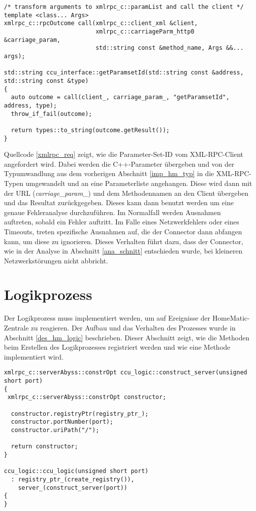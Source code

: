 \lstset{language=C++}
\begin{lstlisting}[frame=single,caption={Absetzen eines XML-RPC-Requests},label=xmlrpc_req]
/* transform arguments to xmlrpc_c::paramList and call the client */
template <class... Args>
xmlrpc_c::rpcOutcome call(xmlrpc_c::client_xml &client,
                          xmlrpc_c::carriageParm_http0 &carriage_param,
                          std::string const &method_name, Args &&... args);

std::string ccu_interface::getParamsetId(std::string const &address, std::string const &type)
{
  auto outcome = call(client_, carriage_param_, "getParamsetId", address, type);
  throw_if_fail(outcome);

  return types::to_string(outcome.getResult());
}
\end{lstlisting}

Quellcode \ref{xmlrpc_req} zeigt, wie die Parameter-Set-ID vom XML-RPC-Client angefordert wird.
Dabei werden die C++-Parameter übergeben und von der Typumwandlung aus dem vorherigen Abschnitt \ref{imp_hm_typ}
in die XML-RPC-Typen umgewandelt und an eine Parameterliste angehangen.
Diese wird dann mit der URL (\emph{carriage\_param\_}) und dem Methodennamen an den Client übergeben und
das Resultat zurückgegeben.
Dieses kann dann benutzt werden um eine genaue Fehleranalyse durchzuführen.
Im Normalfall werden Ausnahmen auftreten, sobald ein Fehler auftritt.
Im Falle eines Netzwerkfehlers oder eines Timeouts, treten spezifische Ausnahmen auf, die der Connector
dann abfangen kann, um diese zu ignorieren.
Dieses Verhalten führt dazu, dass der Connector, wie in der Analyse in Abschnitt \ref{ana_schnitt} entschieden wurde,
bei kleineren Netzwerkstörungen nicht abbricht.

\section{Logikprozess}
\label{imp_hm_logic}

Der Logikprozess muss implementiert werden, um auf Ereignisse der HomeMatic-Zentrale zu reagieren.
Der Aufbau und das Verhalten des Prozesses wurde in Abschnitt \ref{des_hm_logic} beschrieben.
Dieser Abschnitt zeigt, wie die Methoden beim Erstellen des Logikprozesses registriert werden
und wie eine Methode implementiert wird.

\lstset{language=C++}
\begin{lstlisting}[frame=single,caption={Erstellen des Objekts zum Reagieren auf HomeMatic-Ereignisse},label=hm_logic_create]
xmlrpc_c::serverAbyss::constrOpt ccu_logic::construct_server(unsigned short port)
{
 xmlrpc_c::serverAbyss::constrOpt constructor;

  constructor.registryPtr(registry_ptr_);
  constructor.portNumber(port);
  constructor.uriPath("/");

  return constructor;
}

ccu_logic::ccu_logic(unsigned short port)
  : registry_ptr_(create_registry()),
    server_(construct_server(port))
{
}
\end{lstlisting}

